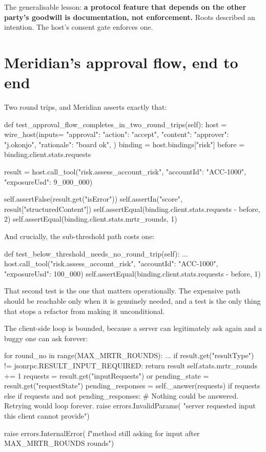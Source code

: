 The generalisable lesson: \textbf{a protocol feature that depends on the other
party's goodwill is documentation, not enforcement.} Roots described an
intention. The host's consent gate enforces one.

\section{Meridian's approval flow, end to end}

Two round trips, and Meridian asserts exactly that:

\begin{py}
def test_approval_flow_completes_in_two_round_trips(self):
    host = wire_host(inputs={
        "approval": {"action": "accept",
                     "content": {"approver": "j.okonjo",
                                 "rationale": "board ok"}},
    })
    binding = host.bindings["risk"]
    before = binding.client.stats.requests

    result = host.call_tool("risk.assess_account_risk",
                            {"accountId": "ACC-1000", "exposureUsd": 9_000_000})

    self.assertFalse(result.get("isError"))
    self.assertIn("score", result["structuredContent"])
    self.assertEqual(binding.client.stats.requests - before, 2)
    self.assertEqual(binding.client.stats.mrtr_rounds, 1)
\end{py}

And crucially, the sub-threshold path costs one:

\begin{py}
def test_below_threshold_needs_no_round_trip(self):
    ...
    host.call_tool("risk.assess_account_risk",
                   {"accountId": "ACC-1000", "exposureUsd": 100_000})
    self.assertEqual(binding.client.stats.requests - before, 1)
\end{py}

That second test is the one that matters operationally. The expensive path
should be reachable only when it is genuinely needed, and a test is the only
thing that stops a refactor from making it unconditional.

The client-side loop is bounded, because a server can legitimately ask again and
a buggy one can ask forever:

\begin{py}
for round_no in range(MAX_MRTR_ROUNDS):
    ...
    if result.get("resultType") != jsonrpc.RESULT_INPUT_REQUIRED:
        return result
    self.stats.mrtr_rounds += 1
    requests = result.get("inputRequests") or {}
    pending_state = result.get("requestState")
    pending_responses = self._answer(requests) if requests else {}
    if requests and not pending_responses:
        # Nothing could be answered. Retrying would loop forever.
        raise errors.InvalidParams(
            "server requested input this client cannot provide")

raise errors.InternalError(
    f"{method} still asking for input after {MAX_MRTR_ROUNDS} rounds")
\end{py}

